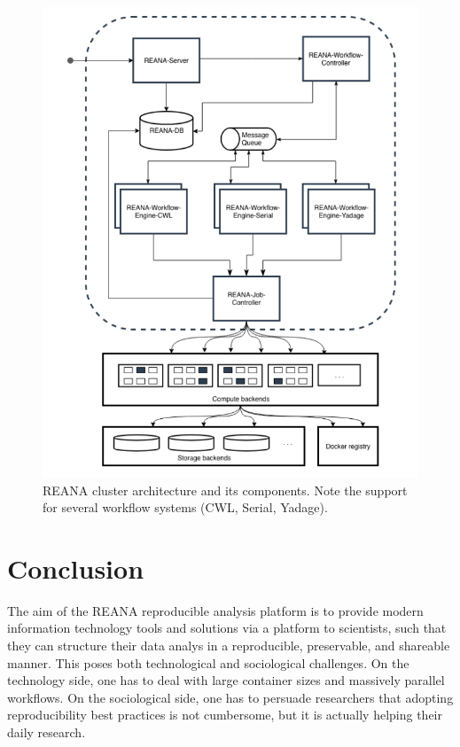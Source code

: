 \begin{figure}[H]
\begin{minipage}[H]{0.49\textwidth}
     \end{minipage}
 \hfill
    \begin{minipage}[H]{0.49\textwidth}
        \centering
        \includegraphics[width=1.0\textwidth]{figures/reana-stack.jpg}
        \caption{REANA cluster architecture and its components. Note the support for several workflow systems (CWL, Serial, Yadage). \cite{reana_paper}}
        \label{fig:reana-stack}
     \end{minipage}
\end{figure}


\section{Conclusion}
The aim of the REANA reproducible analysis platform is to provide modern information technology tools and solutions via a platform to scientists, such that they can structure their data analys in a reproducible, preservable, and shareable manner. This poses both technological and sociological challenges. On the technology side, one has to deal with large container sizes and massively parallel workflows. On the sociological side, one has to persuade researchers that adopting reproducibility best practices is not cumbersome, but it is actually helping their daily research.\\

